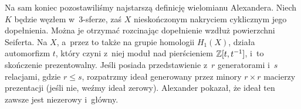 
Na sam koniec pozostawiliśmy najstarszą definicję wielomianu Alexandera.
Niech $K$ będzie węzłem w~3-sferze, zaś $X$ nieskończonym nakryciem cyklicznym jego dopełnienia.
Można je otrzymać rozcinając dopełnienie wzdłuż powierzchni Seiferta.
Na $X$, a~przez to także na grupie homologii $H_1(X)$, działa automorfizm $t$, który czyni z~niej moduł nad pierścieniem $\mathbb Z[t, t^{-1}]$, i~to skończenie prezentowalny.
Jeśli posiada przedstawienie z~$r$ generatorami i~$s$ relacjami, gdzie $r \le s$, rozpatrzmy ideał generowany przez minory $r \times r$ macierzy prezentacji (jeśli nie, weźmy ideał zerowy).
Alexander pokazał, że ideał ten zawsze jest niezerowy i~główny.

